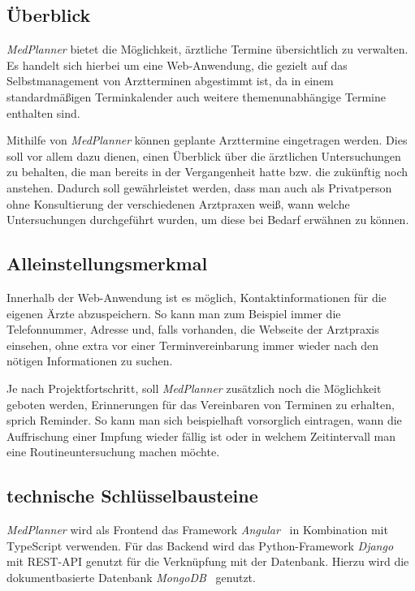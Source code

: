 \documentclass[conference]{IEEEtran}
\begin{document}
\subsection{Überblick}
\textit{MedPlanner} bietet die Möglichkeit, ärztliche Termine übersichtlich zu verwalten. Es handelt sich hierbei um eine Web-Anwendung, die gezielt auf das Selbstmanagement von Arztterminen abgestimmt ist, da in einem standardmäßigen Terminkalender auch weitere themenunabhängige Termine enthalten sind.

Mithilfe von \textit{MedPlanner} können geplante Arzttermine eingetragen werden. Dies soll vor allem dazu dienen, einen Überblick über die ärztlichen Untersuchungen zu behalten, die man bereits in der Vergangenheit hatte bzw. die zukünftig noch anstehen. Dadurch soll gewährleistet werden, dass man auch als Privatperson ohne Konsultierung der verschiedenen Arztpraxen weiß, wann welche Untersuchungen durchgeführt wurden, um diese bei Bedarf erwähnen zu können.

\subsection{Alleinstellungsmerkmal}
Innerhalb der Web-Anwendung ist es möglich, Kontaktinformationen für die eigenen Ärzte abzuspeichern. So kann man zum Beispiel immer die Telefonnummer, Adresse und, falls vorhanden, die Webseite der Arztpraxis einsehen, ohne extra vor einer Terminvereinbarung immer wieder nach den nötigen Informationen zu suchen.

Je nach Projektfortschritt, soll \textit{MedPlanner} zusätzlich noch die Möglichkeit geboten werden, Erinnerungen für das Vereinbaren von Terminen zu erhalten, sprich Reminder. So kann man sich beispielhaft vorsorglich eintragen, wann die Auffrischung einer Impfung wieder fällig ist oder in welchem Zeitintervall man eine Routineuntersuchung machen möchte.\\

\subsection{technische Schlüsselbausteine}
\textit{MedPlanner} wird als Frontend das Framework \textit{Angular}~\cite{angular} in Kombination mit TypeScript verwenden. Für das Backend wird das Python-Framework \textit{Django}~\cite{django} mit REST-API genutzt für die Verknüpfung mit der Datenbank. Hierzu wird die dokumentbasierte Datenbank \textit{MongoDB}~\cite{mongodb} genutzt.
\end{document}
